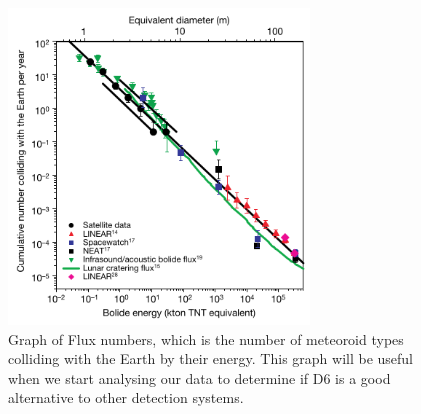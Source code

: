 \begin{figure}
    \centering
    \includegraphics[width=8cm]{flux_brown.png}
    \centering
    \caption{Graph of Flux numbers, which is the number of meteoroid types colliding with the Earth by their energy. This graph will be useful when we start analysing our data to determine if D6 is a good alternative to other detection systems.}
    \label{fig: 1.2}
\end{figure}
